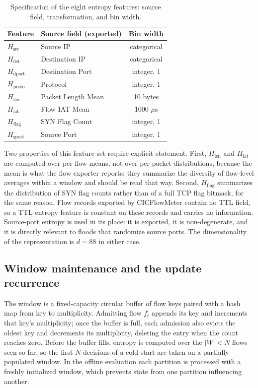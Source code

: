 \documentclass{ieeeaccess}
\begin{document}
\begin{table}[!t]
\caption{Specification of the eight entropy features: source field, transformation, and bin width.}
\centering
\label{tab:featurespec}
\footnotesize
\setlength{\tabcolsep}{3pt}
\renewcommand{\arraystretch}{1.2}
\begin{tabular}{@{}llc@{}}
\toprule
\textbf{Feature} & \textbf{Source field (exported)} & \textbf{Bin width} \\
\midrule
$H_{\mathrm{src}}$      & Source IP                & categorical \\
$H_{\mathrm{dst}}$      & Destination IP           & categorical \\
$H_{\mathrm{dport}}$    & Destination Port         & integer, 1 \\
$H_{\mathrm{proto}}$    & Protocol                 & integer, 1 \\
$H_{\mathrm{len}}$      & Packet Length Mean       & 10 bytes \\
$H_{\mathrm{iat}}$      & Flow IAT Mean            & 1000 $\mu$s \\
$H_{\mathrm{flag}}$     & SYN Flag Count           & integer, 1 \\
$H_{\mathrm{sport}}$    & Source Port              & integer, 1 \\
\bottomrule
\end{tabular}
\end{table}

Two properties of this feature set require explicit statement. First, $H_{\mathrm{len}}$ and $H_{\mathrm{iat}}$ are computed over per-flow means, not over per-packet distributions, because the mean is what the flow exporter reports; they summarize the diversity of flow-level averages within a window and should be read that way. Second, $H_{\mathrm{flag}}$ summarizes the distribution of SYN flag counts rather than of a full TCP flag bitmask, for the same reason. Flow records exported by CICFlowMeter contain no TTL field, so a TTL entropy feature is constant on these records and carries no information. Source-port entropy is used in its place: it is exported, it is non-degenerate, and it is directly relevant to floods that randomize source ports. The dimensionality of the representation is $d = 88$ in either case.

\subsection{Window maintenance and the update recurrence}
\label{sec:rolling}
The window is a fixed-capacity circular buffer of flow keys paired with a hash map from key to multiplicity. Admitting flow $f_t$ appends its key and increments that key's multiplicity; once the buffer is full, each admission also evicts the oldest key and decrements its multiplicity, deleting the entry when the count reaches zero. Before the buffer fills, entropy is computed over the $|W| < N$ flows seen so far, so the first $N$ decisions of a cold start are taken on a partially populated window. In the offline evaluation each partition is processed with a freshly initialized window, which prevents state from one partition influencing another.
\end{document}
